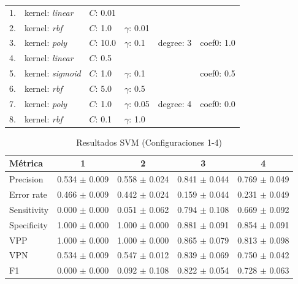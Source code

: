 \documentclass[a4paper,10pt]{article}
\begin{document}
    \begin{tabular}{r l l l l l}
    1. & kernel: \textit{linear} & $C$: 0.01 \\
    2. &  kernel: \textit{rbf} & $C$: 1.0 & $\gamma$: 0.01 \\
    3. &  kernel: \textit{poly} & $C$: 10.0 & $\gamma$: 0.1 & degree: 3 & coef0: 1.0 \\
    4. &  kernel: \textit{linear} & $C$: 0.5 \\
    5. &  kernel: \textit{sigmoid} & $C$: 1.0 & $\gamma$: 0.1 && coef0: 0.5 \\
    6. &  kernel: \textit{rbf} & $C$: 5.0 & $\gamma$: 0.5 \\
    7. &  kernel: \textit{poly} & $C$: 1.0 & $\gamma$: 0.05 & degree: 4 & coef0: 0.0 \\
    8. &  kernel: \textit{rbf} & $C$: 0.1 & $\gamma$: 1.0 \\
    \end{tabular}
    \begin{table}[h!]
    \centering
    \caption{Resultados SVM (Configuraciones 1-4)}
    \begin{tabular}{lcccc}
    \toprule
    Métrica & 1 & 2 & 3 & 4 \\
    \midrule
    Precision & 0.534 $\pm$ 0.009 & 0.558 $\pm$ 0.024 & 0.841 $\pm$ 0.044 & 0.769 $\pm$ 0.049 \\
    Error rate & 0.466 $\pm$ 0.009 & 0.442 $\pm$ 0.024 & 0.159 $\pm$ 0.044 & 0.231 $\pm$ 0.049 \\
    Sensitivity & 0.000 $\pm$ 0.000 & 0.051 $\pm$ 0.062 & 0.794 $\pm$ 0.108 & 0.669 $\pm$ 0.092 \\
    Specificity & 1.000 $\pm$ 0.000 & 1.000 $\pm$ 0.000 & 0.881 $\pm$ 0.091 & 0.854 $\pm$ 0.091 \\
    VPP & 1.000 $\pm$ 0.000 & 1.000 $\pm$ 0.000 & 0.865 $\pm$ 0.079 & 0.813 $\pm$ 0.098 \\
    VPN & 0.534 $\pm$ 0.009 & 0.547 $\pm$ 0.012 & 0.839 $\pm$ 0.069 & 0.750 $\pm$ 0.042 \\
    F1 & 0.000 $\pm$ 0.000 & 0.092 $\pm$ 0.108 & 0.822 $\pm$ 0.054 & 0.728 $\pm$ 0.063 \\
    \bottomrule
    \end{tabular}
    \label{tab:svm1_4}
    \end{table}
    
\end{document}

